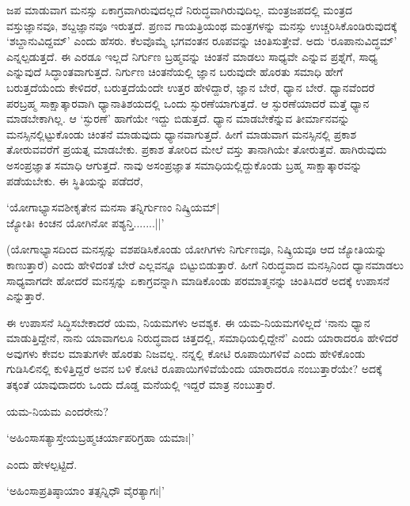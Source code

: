 ಜಪ ಮಾಡುವಾಗ ಮನಸ್ಸು ಏಕಾಗ್ರವಾಗಿರುವುದಲ್ಲದೆ ನಿರುದ್ಧವಾಗಿರುವುದಿಲ್ಲ. ಮಂತ್ರಜಪದಲ್ಲಿ ಮಂತ್ರದ ವಸ್ತುಜ್ಞಾನವೂ, ಶಬ್ದಜ್ಞಾನವೂ ಇರುತ್ತದೆ. ಪ್ರಣವ ಗಾಯತ್ರಿಯಂಥ ಮಂತ್ರಗಳನ್ನು ಮನಸ್ಸು ಉಚ್ಚರಿಸಿಕೊಂಡಿರುವುದಕ್ಕೆ `ಶಬ್ದಾನುವಿದ್ದಮ್' ಎಂದು ಹೆಸರು. ಕೆಲವೊಮ್ಮೆ ಭಗವಂತನ ರೂಪವನ್ನು ಚಿಂತಿಸುತ್ತೇವೆ. ಅದು `ರೂಪಾನುವಿದ್ಧಮ್' ಎನ್ನಲ್ಪಡುತ್ತದೆ. ಈ ಎರಡೂ ಇಲ್ಲದೆ ನಿರ್ಗುಣ ಬ್ರಹ್ಮವನ್ನು ಚಿಂತನೆ ಮಾಡಲು ಸಾಧ್ಯವೇ ಎನ್ನುವ ಪ್ರಶ್ನೆಗೆ, ಸಾಧ್ಯ ಎನ್ನುವುದೆ ಸಿದ್ಧಾಂತವಾಗುತ್ತದೆ. ನಿರ್ಗುಣ ಚಿಂತನೆಯಲ್ಲಿ ಜ್ಞಾನ ಬರುವುದೇ ಹೊರತು ಸಮಾಧಿ ಹೇಗೆ ಬರುತ್ತದೆಯೆಂದು ಕೇಳಿದರೆ, ಬರುತ್ತದೆಯೆಂದೇ ಉತ್ತರ ಹೇಳಿದ್ದಾರೆ, ಜ್ಞಾನ ಬೇರೆ, ಧ್ಯಾನ ಬೇರೆ. ಧ್ಯಾನವೆಂದರೆ ಪರಬ್ರಹ್ಮ ಸಾಕ್ಷಾತ್ಕಾರವಾಗಿ ಧ್ಯಾನಾತಿಶಯದಲ್ಲಿ ಒಂದು ಸ್ಫುರಣೆಯಾಗುತ್ತದೆ. ಆ ಸ್ಫುರಣೆಯಾದರೆ ಮತ್ತೆ ಧ್ಯಾನ ಮಾಡಬೇಕಾಗಿಲ್ಲ. ಆ `ಸ್ಫುರಣೆ' ಹಾಗೆಯೇ ಇದ್ದು ಬಿಡುತ್ತದೆ. ಧ್ಯಾನ ಮಾಡಬೇಕೆನ್ನುವ ತೀರ್ಮಾನವನ್ನು ಮನಸ್ಸಿನಲ್ಲಿಟ್ಟುಕೊಂಡು ಚಿಂತನೆ ಮಾಡುವುದು ಧ್ಯಾನವಾಗುತ್ತದೆ. ಹೀಗೆ ಮಾಡುವಾಗ ಮನಸ್ಸಿನಲ್ಲಿ ಪ್ರಕಾಶ ತೋರುವವರೆಗೆ ಪ್ರಯತ್ನ ಮಾಡಬೇಕು. ಪ್ರಕಾಶ ತೋರಿದ ಮೇಲೆ ವಸ್ತು ತಾನಾಗಿಯೇ ತೋರುತ್ತವೆ. ಹಾಗಿರುವುದು ಅಸಂಪ್ರಜ್ಞಾತ ಸಮಾಧಿ ಆಗುತ್ತದೆ. ನಾವು ಅಸಂಪ್ರಜ್ಞಾತ ಸಮಾಧಿಯಲ್ಲಿದ್ದುಕೊಂಡು ಬ್ರಹ್ಮ ಸಾಕ್ಷಾತ್ಕಾರವನ್ನು ಪಡೆಯಬೇಕು. ಈ ಸ್ಥಿತಿಯನ್ನು ಪಡೆದರೆ, 

\begin{shloka}
`ಯೋಗಾಭ್ಯಾಸವಶೀಕೃತೇನ ಮನಸಾ ತನ್ನಿರ್ಗುಣಂ ನಿಷ್ಕ್ರಿಯಮ್|\\
ಜ್ಯೋತಿಃ ಕಿಂಚನ ಯೋಗಿನೋ ಪಶ್ಯನ್ತಿ.......||'
\end{shloka}

(ಯೋಗಾಭ್ಯಾಸದಿಂದ ಮನಸ್ಸನ್ನು ವಶಪಡಿಸಿಕೊಂಡು ಯೋಗಿಗಳು ನಿರ್ಗುಣವೂ, ನಿಷ್ಕ್ರಿಯವೂ ಆದ ಜ್ಯೋತಿಯನ್ನು ಕಾಣುತ್ತಾರೆ) ಎಂದು ಹೇಳಿದಂತೆ ಬೇರೆ ಎಲ್ಲವನ್ನೂ ಬಿಟ್ಟುಬಿಡುತ್ತಾರೆ. ಹೀಗೆ ನಿರುದ್ಧವಾದ ಮನಸ್ಸಿನಿಂದ ಧ್ಯಾನಮಾಡಲು ಸಾಧ್ಯವಾಗದೇ ಹೋದರೆ ಮನಸ್ಸನ್ನು ಏಕಾಗ್ರವನ್ನಾಗಿ ಮಾಡಿಕೊಂಡು ಪರಮಾತ್ಮನನ್ನು ಚಿಂತಿಸಿದರೆ ಅದಕ್ಕೆ ಉಪಾಸನೆ ಎನ್ನುತ್ತಾರೆ.

ಈ ಉಪಾಸನೆ ಸಿದ್ಧಿಸಬೇಕಾದರೆ ಯಮ, ನಿಯಮಗಳು ಅವಶ್ಯಕ. ಈ ಯಮ-ನಿಯಮಗಳಿಲ್ಲದೆ `ನಾನು ಧ್ಯಾನ ಮಾಡುತ್ತಿದ್ದೇನೆ, ನಾನು ಯಾವಾಗಲೂ ನಿರುದ್ಧವಾದ ಚಿತ್ತದಲ್ಲಿ, ಸಮಾಧಿಯಲ್ಲಿದ್ದೇನೆ' ಎಂದು ಯಾರಾದರೂ ಹೇಳಿದರೆ ಅವುಗಳು ಕೇವಲ ಮಾತುಗಳೇ ಹೊರತು ನಿಜವಲ್ಲ. ನನ್ನಲ್ಲಿ ಕೋಟಿ ರೂಪಾಯಿಗಳಿವೆ ಎಂದು ಹೇಳಿಕೊಂಡು ಗುಡಿಸಿಲಿನಲ್ಲಿ ಕುಳಿತ್ತಿದ್ದರೆ ಅವನ ಬಳಿ ಕೋಟಿ ರೂಪಾಯಿಗಳಿವೆಯೆಂದು ಯಾರಾದರೂ ನಂಬುತ್ತಾರೆಯೇ? ಅದಕ್ಕೆ ತಕ್ಕಂತೆ ಯಾವುದಾದರು ಒಂದು ದೊಡ್ಡ ಮನೆಯಲ್ಲಿ ಇದ್ದರೆ ಮಾತ್ರ ನಂಬುತ್ತಾರೆ.

ಯಮ-ನಿಯಮ ಎಂದರೇನು?

\begin{shloka}
`ಅಹಿಂಸಾಸತ್ಯಾಸ್ತೇಯಬ್ರಹ್ಮಚರ್ಯಾಪರಿಗ್ರಹಾ ಯಮಾಃ|'
\end{shloka}

ಎಂದು ಹೇಳಲ್ಪಟ್ಟಿದೆ.

\begin{shloka}
`ಅಹಿಂಸಾಪ್ರತಿಷ್ಠಾಯಾಂ ತತ್ಸನ್ನಿಧೌ ವೈರತ್ಯಾಗಃ|'
\end{shloka}

